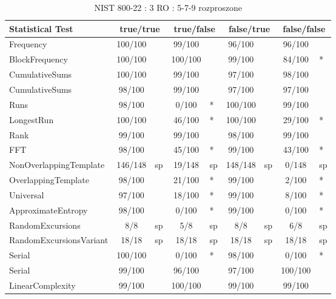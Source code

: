 \begin{table}[H]
\centering
\caption{NIST 800-22 : 3 RO : 5-7-9 rozproszone}
\label{tab:ch4_nist_22_3RO_21I_DISTRIBUTED}
\begin{tabular}{|l|c|l|c|l|c|l|c|l|}
\hline
\textbf{Statistical Test} & \multicolumn{2}{c|}{\textbf{true/true}} & \multicolumn{2}{c|}{\textbf{true/false}} & \multicolumn{2}{c|}{\textbf{false/true}} & \multicolumn{2}{c|}{\textbf{false/false}} \\ \hline
Frequency               & 100/100 &     &  99/100 &     &  96/100 &     &  96/100 &     \\ \hline
BlockFrequency          & 100/100 &     & 100/100 &     &  99/100 &     &  84/100 & *   \\ \hline
CumulativeSums          & 100/100 &     &  99/100 &     &  97/100 &     &  98/100 &     \\ \hline
CumulativeSums          &  98/100 &     &  99/100 &     &  97/100 &     &  97/100 &     \\ \hline
Runs                    &  98/100 &     &   0/100 & *   & 100/100 &     &  99/100 &     \\ \hline
LongestRun              & 100/100 &     &  46/100 & *   & 100/100 &     &  29/100 & *   \\ \hline
Rank                    &  99/100 &     &  99/100 &     &  98/100 &     &  99/100 &     \\ \hline
FFT                     &  98/100 &     &  45/100 & *   &  99/100 &     &  43/100 & *   \\ \hline
NonOverlappingTemplate  & 146/148 & sp  &  19/148 & sp  & 148/148 & sp  &   0/148 & sp  \\ \hline
OverlappingTemplate     &  98/100 &     &  21/100 & *   &  99/100 &     &   2/100 & *   \\ \hline
Universal               &  97/100 &     &  18/100 & *   &  99/100 &     &   8/100 & *   \\ \hline
ApproximateEntropy      &  98/100 &     &   0/100 & *   &  99/100 &     &   0/100 & *   \\ \hline
RandomExcursions        &     8/8 & sp  &     5/8 & sp  &     8/8 & sp  &     6/8 & sp  \\ \hline
RandomExcursionsVariant &   18/18 & sp  &   18/18 & sp  &   18/18 & sp  &   18/18 & sp  \\ \hline
Serial                  & 100/100 &     &   0/100 & *   &  98/100 &     &   0/100 & *   \\ \hline
Serial                  &  99/100 &     &  96/100 &     &  97/100 &     & 100/100 &     \\ \hline
LinearComplexity        &  99/100 &     & 100/100 &     &  99/100 &     &  99/100 &     \\ \hline
\end{tabular}
\end{table}



